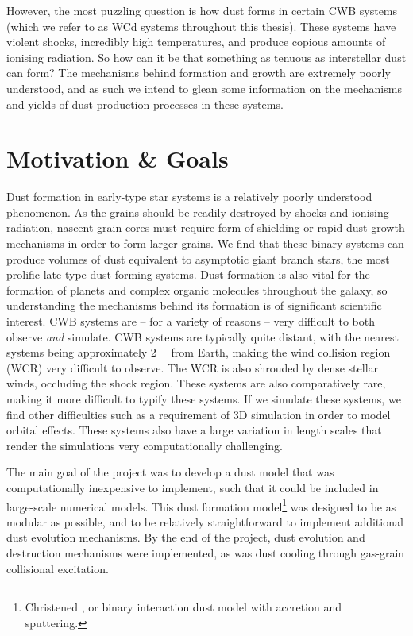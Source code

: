 However, the most puzzling question is how dust forms in certain CWB systems (which we refer to as WCd systems throughout this thesis).
These systems have violent shocks, incredibly high temperatures, and produce copious amounts of ionising radiation.
So how can it be that something as tenuous as interstellar dust can form?
The mechanisms behind formation and growth are extremely poorly understood, and as such we intend to glean some information on the mechanisms and yields of dust production processes in these systems.

\section{Motivation \& Goals}
\label{sec:projectgoals}

Dust formation in early-type star systems is a relatively poorly understood phenomenon.
As the grains should be readily destroyed by shocks and ionising radiation, nascent grain cores must require form of shielding or rapid dust growth mechanisms in order to form larger grains.
We find that these binary systems can produce volumes of dust equivalent to asymptotic giant branch stars, the most prolific late-type dust forming systems.
Dust formation is also vital for the formation of planets and complex organic molecules throughout the galaxy, so understanding the mechanisms behind its formation is of significant scientific interest.
CWB systems are -- for a variety of reasons -- very difficult to both observe \emph{and} simulate.
CWB systems are typically quite distant, with the nearest systems being approximately \SI{2}{\kilo\parsec} from Earth, making the wind collision region (WCR) very difficult to observe.
The WCR is also shrouded by dense stellar winds, occluding the shock region.
These systems are also comparatively rare, making it more difficult to typify these systems.
If we simulate these systems, we find other difficulties such as a requirement of 3D simulation in order to model orbital effects.
These systems also have a large variation in length scales that render the simulations very computationally challenging.

The main goal of the project was to develop a dust model that was computationally inexpensive to implement, such that it could be included in large-scale numerical models.
This dust formation model\footnote{Christened \bidmas{}, or binary interaction dust model with accretion and sputtering.} was designed to be as modular as possible, and to be relatively straightforward to implement additional dust evolution mechanisms.
By the end of the project, dust evolution and destruction mechanisms were implemented, as was dust cooling through gas-grain collisional excitation.

